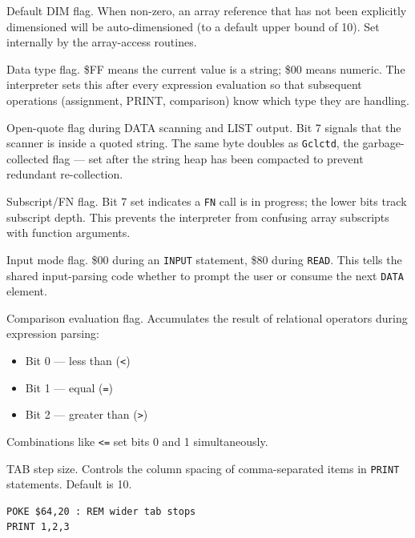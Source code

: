 
Default DIM flag.  When non-zero, an array reference that has not been
explicitly dimensioned will be auto-dimensioned (to a default upper bound of
10).  Set internally by the array-access routines.


Data type flag.  \$FF means the current value is a string; \$00 means numeric.
The interpreter sets this after every expression evaluation so that subsequent
operations (assignment, PRINT, comparison) know which type they are handling.


Open-quote flag during DATA scanning and LIST output.  Bit 7 signals that the
scanner is inside a quoted string.  The same byte doubles as \texttt{Gclctd},
the garbage-collected flag --- set after the string heap has been compacted to
prevent redundant re-collection.


Subscript/FN flag.  Bit 7 set indicates a \texttt{FN} call is in progress;
the lower bits track subscript depth.  This prevents the interpreter from
confusing array subscripts with function arguments.


Input mode flag.  \$00 during an \texttt{INPUT} statement, \$80 during
\texttt{READ}.  This tells the shared input-parsing code whether to prompt the
user or consume the next \texttt{DATA} element.


Comparison evaluation flag.  Accumulates the result of relational operators
during expression parsing:
\begin{itemize}
  \item Bit 0 --- less than (\texttt{<})
  \item Bit 1 --- equal (\texttt{=})
  \item Bit 2 --- greater than (\texttt{>})
\end{itemize}
Combinations like \texttt{<=} set bits 0 and 1 simultaneously.


TAB step size.  Controls the column spacing of comma-separated items in
\texttt{PRINT} statements.  Default is 10.

\begin{lstlisting}
POKE $64,20 : REM wider tab stops
PRINT 1,2,3
\end{lstlisting}

